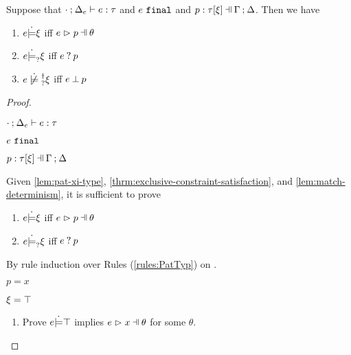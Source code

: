 \begin{lemma}
  \label{lem:const-matching-coherence}
  Suppose that $\cdot \mathbin{;} \Delta_e \vdash e : \tau$ and $e ~\mathtt{final}$ and $\chpattyp{p}{\tau}{\xi}{\Gamma}{\Delta}$. Then we have
  \begin{enumerate}
  \item $e \dot{\models} \xi$ iff $\hpatmatch{e}{p}{\theta}$
  \item $e \dot{\models}_{?} \xi$ iff $e \mathbin{?} p$
  \item $\cnotsatisfyormay{e}{\xi}$ iff $e \mathbin{\bot} p$
  \end{enumerate}
\end{lemma}
\begin{proof}
\begin{pfsteps*}
\item $\cdot \mathbin{;} \Delta_e \vdash e : \tau$  
\item $e ~\mathtt{final}$  
\item $\chpattyp{p}{\tau}{\xi}{\Gamma}{\Delta}$  
\end{pfsteps*}
Given \autoref{lem:pat-xi-type}, \autoref{thrm:exclusive-constraint-satisfaction}, and \autoref{lem:match-determinism}, it is sufficient to prove
\begin{enumerate}
  \item $e \dot{\models} \xi$ iff $\hpatmatch{e}{p}{\theta}$
  \item $e \dot{\models}_{?} \xi$ iff $e \mathbin{?} p$
\end{enumerate}
By rule induction over Rules (\ref{rules:PatTyp}) on .
\begin{byCases}
\item[\text{(\ref{rule:PTVar})}]
    \begin{pfsteps*}
    \item $p=x$ 
    \item $\xi=\top$ 
    \end{pfsteps*}
    \begin{enumerate}
    \item Prove $e \dot{\models} \top$ implies $\hpatmatch{e}{x}{\theta}$ for some $\theta$.

\end{enumerate}
\end{byCases}
\end{proof}
